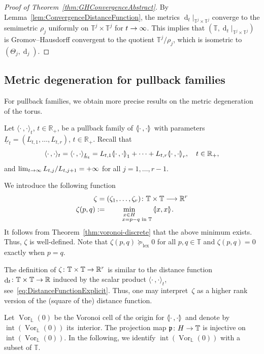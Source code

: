 \documentclass[AHL,Unicode,longabstracts]{cedram}
\newcommand{\innone}[2]{{\langle#2\rangle_{#1}}}
\newcommand{\llangle}{\mathopen{\langle\mkern -3.1mu\lvert}}
\newcommand{\rrangle}{\mathclose{\rvert\mkern -3.1mu\rangle}}
\newcommand{\highinn}[2]{{\llangle#2\rrangle_{#1}}}
\newcommand{\rest}[1]{\vert_{#1}}
\DeclareMathOperator{\Vor}{Vor}
\DeclareMathOperator{\intt}{int}
\DeclareMathOperator{\dist}{d}
\newcommand{\R}{\mathbb{R}}
\newcommand{\T}{\mathbb{T}}
\renewcommand{\L}{\mathbb{L}}
\newcommand{\proj}{\mathfrak{p}}
\newcommand{\dtor}{\zeta}
\newcommand{\interior}[1]{\intt(#1)}
\newcommand{\gexeq}{\succeq_{\mathrm{lex}}}
\renewcommand*{\to}{\mathchoice{\longrightarrow}{\rightarrow}{\rightarrow}{\rightarrow}}
\newcommand*{\Mk}{\mkern -2mu}
\newcommand*{\MK}{\mkern 2mu}
\begin{document}
\begin{proof}[Proof of Theorem~\ref{thm:GHConvergenceAbstract}]
By Lemma~\ref{lem:ConvergenceDistanceFunction}, the metrics $\dist_t \rest{\T^j \times \T^j}$ converge to the semimetric $\rho_j$ uniformly on $\T^j \times \T^j$ for $t \to \infty$. This implies that $(\T, \dist_t \rest{\T^j \times \T^j})$ is Gromov--Hausdorff convergent to the quotient $\T^j / \rho_j$, which is isometric to $(\Theta_{j}, \dist_{j})$.
\end{proof}


\subsection{Metric degeneration for pullback families}

For pullback families, we obtain more precise results on the metric degeneration of the torus.

Let $\innone{t}{\cdot\,, \cdot}$, $t\! \in \R_+$, be a pullback family of $\highinn{}{\cdot\,, \cdot}$ with parameters $\underline L_t\! =\!(L_{t,1}, \dots, L_{t,r})$, $t \in \R_+$. Recall that
\[
\innone{t}{\cdot\,,\cdot}= \innone{\underline L_t}{\cdot\,,\cdot} = L_{t,1} \highinn{1}{\cdot\,,\cdot} + \dots + L_{t,r} \highinn{r}{\cdot\,,\cdot}, \quad t\in \R_+,
\]
and $\lim_{t \to \infty}L_{t,j}/L_{t,j+1} = + \infty$ for all $j= 1, \dots, r-1$.

We introduce the following function
\begin{align*}
\dtor &= (\dtor_1, \dots, \dtor_r) \colon \T\times \T \to \R^r \\
\dtor(p,q) \,\MK &\!\Mk:= \min_{\substack{x \in H\\
\qquad\, x = p-q \text{ in } \T}} \highinn{}{x,x}.
\end{align*}
It follows from Theorem~\ref{thm:voronoi-discrete} that the above minimum exists. Thus, $\zeta$ is well-defined. Note that $\zeta(p,q) \gexeq 0$ for all $p, q \in \T$ and $\zeta(p,q) =0$ exactly when $p=q$.
\begin{rema}
The definition of $\dtor \colon \T\times \T \to \R^r$ is similar to the distance function $\dist_t \colon \T \times \T \to \R$ induced by the scalar product $\innone{t}{\cdot\,,\cdot}$, see~\eqref{eq:DistanceFunctionExplicit}. Thus, one may interpret~$\zeta$ as a higher rank version of the (square of the) distance function.%
\end{rema}

Let $\Vor_\L(0)$ be the Voronoi cell of the origin for $\highinn{}{\cdot\,,\cdot}$ and denote by $\interior{\Vor_\L(0)}$ its~interior. The projection map $\proj \colon H \to \T$ is injective on $\interior{\Vor_\L(0)}$. In the following, we identify $\interior{\Vor_\L(0)}$ with a subset of $\T$.
\end{document}
